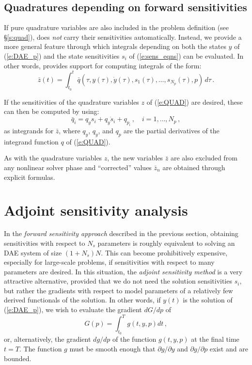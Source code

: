 \subsection{Quadratures depending on forward sensitivities}
If pure quadrature variables are also included in the problem definition
(see \S\ref{s:quad}), {\idas} does {\em not} carry their sensitivities
automatically. Instead, we provide a more general feature through which
integrals depending on both the states $y$ of (\ref{e:DAE_p}) and the
state sensitivities $s_i$ of (\ref{e:sens_eqns}) can be evaluated. In other
words, {\idas} provides support for computing integrals of the form:
\begin{equation*}
 \bar z(t) = \int_{t_0}^t \bar q(\tau, y(\tau), \dot{y}(\tau), s_1(\tau), \ldots,
              s_{N_p}(\tau),p) \, d\tau \, .
\end{equation*}

If the sensitivities of the quadrature variables $z$ of (\ref{e:QUAD}) are
desired, these can then be computed by using:
\begin{equation*}
  \bar q_i = q_y s_i + q_{\dot{y}} \dot{s}_i + q_{p_i} \, , \quad i = 1,\ldots,N_p \, ,
\end{equation*}
as integrands for $\bar z$, where $q_y$, $q_{\dot{y}}$, and $q_p$ are the partial
derivatives of the integrand function $q$ of (\ref{e:QUAD}).

As with the quadrature variables $z$, the new variables $\bar z$ are also excluded
from any nonlinear solver phase and ``corrected'' values $\bar z_n$ are obtained
through explicit formulas.


\section{Adjoint sensitivity analysis}\label{ss:adj_sensi}
In the {\em forward sensitivity approach} described in the previous
section, obtaining sensitivities with respect to $N_s$ parameters is roughly
equivalent to solving an DAE system of size $(1+N_s) N$. This can become
prohibitively expensive, especially for large-scale problems, if sensitivities
with respect to many parameters are desired.
In this situation, the {\em adjoint sensitivity method} is a very
attractive alternative, provided that we do not need the solution sensitivities
$s_i$, but rather the gradients with respect to model parameters of a relatively
few derived functionals of the solution. In other words, if $y(t)$ is the solution
of (\ref{e:DAE_p}), we wish to evaluate the gradient ${dG}/{dp}$ of
\begin{equation}\label{e:G}
G(p) = \int_{t_0}^T g(t, y, p) dt \, ,
\end{equation}
or, alternatively, the gradient ${dg}/{dp}$ of the function $g(t, y, p)$
at the final time $t = T$.
The function $g$ must be smooth enough that $\partial g / \partial y$
and $\partial g / \partial p$ exist and are bounded.


